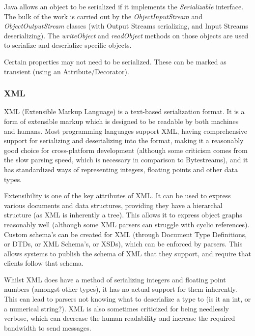 \documentclass{article}
\begin{document}
Java allows an object to be serialized if it implements the \textit{Serializable} interface. The bulk of the work is carried out by the \textit{ObjectInputStream} and \textit{ObjectOutputStream} classes (with Output Streams serializing, and Input Streams deserializing). The \textit{writeObject} and \textit{readObject} methods on those objects are used to serialize and deserialize specific objects. 

Certain properties may not need to be serialized. These can be marked as transient (using an Attribute/Decorator). 

\subsubsection{XML}
XML (Extensible Markup Language) is a text-based serialization format. It is a form of extensible markup which is designed to be readable by both machines and humans. Most programming languages support XML, having comprehensive support for serializing and deserializing into the format, making it a reasonably good choice for cross-platform development (although some criticism comes from the slow parsing speed, which is necessary in comparison to Bytestreams), and it has standardized ways of representing integers, floating points and other data types.

Extensibility is one of the key attributes of XML. It can be used to express various documents and data structures, providing they have a hierarchal structure (as XML is inherently a tree). This allows it to express object graphs reasonably well (although some XML parsers can struggle with cyclic references). Custom schema's can be created for XML (through Document Type Definitions, or DTDs, or XML Schema's, or XSDs), which can be enforced by parsers. This allows systems to publish the schema of XML that they support, and require that clients follow that schema. 

Whilst XML does have a method of serializing integers and floating point numbers (amongst other types), it has no actual support for them inherently. This can lead to parsers not knowing what to deserialize a type to (is it an int, or a numerical string?). XML is also sometimes criticized for being needlessly verbose, which can decrease the human readability and increase the required bandwidth to send messages.
\end{document}
